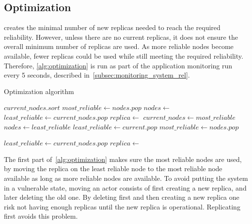 \documentclass{cslthse-msc}
\begin{document}
\subsection{Optimization} \label{subsec:design_optimization}
 creates the minimal number of new replicas needed to reach the required reliability. However, unless there are no current replicas, it does not ensure the overall minimum number of replicas are used. As more reliable nodes become available, fewer replicas could be used while still meeting the required reliability. Therefore, \cref{alg:optimization} is run as part of the application monitoring run every 5 seconds, described in~\cref{subsec:monitoring_system_rel}.

\begin{algorithm} 
	\caption{Optimization algorithm} \label{alg:optimization}
	\begin{algorithmic}[1]
	\Statex
	\Do
		\State $current\_nodes.sort$
		\State $most\_reliable\gets nodes.pop$
		\State $nodes\gets $ 
		\State $least\_reliable\gets current\_nodes.pop$
		\State
			\State $replica\gets $
			\State
			\State
			\State
			\State $current\_nodes\gets most\_reliable$
			\State $nodes\gets least\_reliable$
			\State $least\_reliable\gets current.pop$
			\State $most\_reliable\gets nodes.pop$
		\EndIf
	\EndProcedure
	\State
	
	\Do 
		\State $least\_reliable\gets current\_nodes.pop$
			\State $replica\gets $
			\State
		\EndIf
	\EndProcedure
	\end{algorithmic}
\end{algorithm}

The first part of~\cref{alg:optimization} makes sure the most reliable nodes are used, by moving the replica on the least reliable node to the most reliable node available as long as more reliable nodes are available. To avoid putting the system in a vulnerable state, moving an actor consists of first creating a new replica, and later deleting the old one. By deleting first and then creating a new replica one risk not having enough replicas until the new replica is operational. Replicating first avoids this problem.
\end{document}
